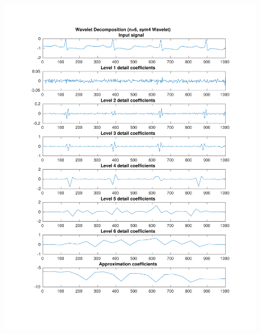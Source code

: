 \documentclass{beamer}
\begin{document}
\begin{frame}
\begin{columns}
\begin{figure}
\includegraphics[width=\textwidth]{fig/112l1_dwt2.pdf}
\end{figure}
\end{columns}
\end{frame}
\end{document}
